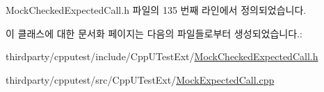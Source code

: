 Mock\+Checked\+Expected\+Call.\+h 파일의 135 번째 라인에서 정의되었습니다.



이 클래스에 대한 문서화 페이지는 다음의 파일들로부터 생성되었습니다.\+:\begin{DoxyCompactItemize}
\item 
thirdparty/cpputest/include/\+Cpp\+U\+Test\+Ext/\hyperlink{_mock_checked_expected_call_8h}{Mock\+Checked\+Expected\+Call.\+h}\item 
thirdparty/cpputest/src/\+Cpp\+U\+Test\+Ext/\hyperlink{_mock_expected_call_8cpp}{Mock\+Expected\+Call.\+cpp}\end{DoxyCompactItemize}
